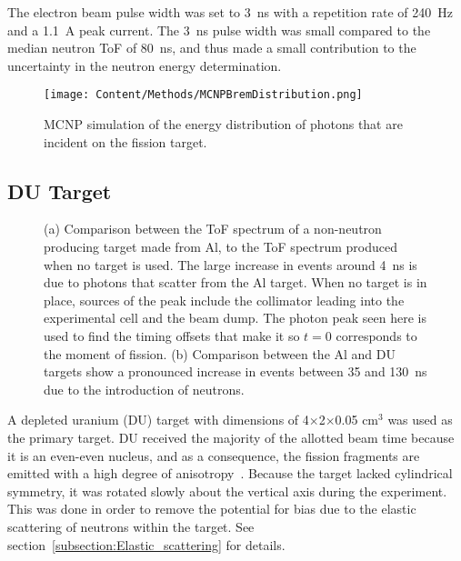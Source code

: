 The electron beam pulse width was set to 3~ns with a repetition rate of 240~Hz and a 1.1~A peak current.
The 3~ns pulse width was small compared to the median neutron ToF of 80~ns, and thus made a small contribution to the uncertainty in the neutron energy determination.

\begin{figure}[h]
\centering
\texttt{[image: Content/Methods/MCNPBremDistribution.png]}
\caption{MCNP simulation of the energy distribution of photons that are incident on the fission target.}
\label{fig:BremDist}
\end{figure}

\subsection{DU Target}
\label{subsection:targets}
\begin{figure}[]
\centering
    \caption{(a) Comparison between the ToF spectrum of a non-neutron producing target made from Al, to the ToF spectrum produced when no target is used.
    The large increase in events around 4~ns is due to photons that scatter from the Al target.
    When no target is in place, sources of the peak include the collimator leading into the experimental cell and the beam dump.
    The photon peak seen here is used to find the timing offsets that make it so $t=0$ corresponds to the moment of fission.
    (b) Comparison between the Al and DU targets show a pronounced increase in events between 35 and 130~ns due to the introduction of neutrons.}
    \label{fig:ToF}
\end{figure}
A depleted uranium (DU) target with dimensions of 4$\times$2$\times$0.05 $\text{cm}^3$ was used as the primary target.
DU received the majority of the allotted beam time because it is an even-even nucleus, and as a consequence, the fission fragments are emitted with a high degree of anisotropy~\cite{1977FragAss}.
Because the target lacked cylindrical symmetry, it was rotated slowly about the vertical axis during the experiment.
This was done in order to remove the potential for bias due to the elastic scattering of neutrons within the target.
See section~\ref{subsection:Elastic_scattering} for details.

